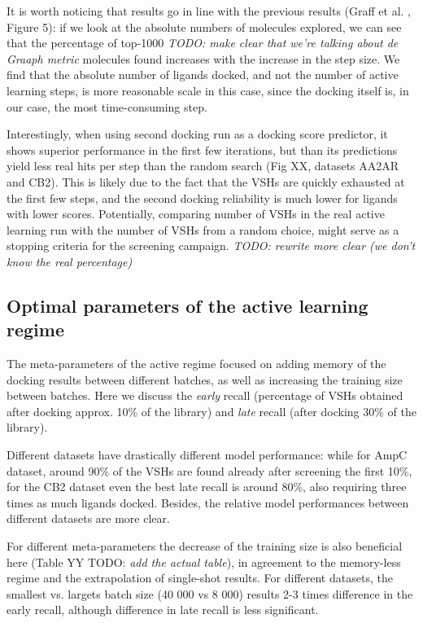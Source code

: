 It is worth noticing that results go in line with the previous results (Graff et al. \cite{Graff2021AcceleratingLearning}, Figure 5): if we look at the absolute numbers of molecules explored, we can see that the percentage of top-1000 \textit{TODO: make clear that we're talking about de Graaph metric} molecules found increases with the increase in the step size. We find that the absolute number of ligands docked, and not the number of active learning steps, is more reasonable scale in this case, since the docking itself is, in our case, the most time-consuming step.

Interestingly, when using second docking run as a docking score predictor, it shows superior performance in the first few iterations, but than its predictions yield less real hits per step than the random search (Fig XX, datasets AA2AR and CB2). This is likely due to the fact that the VSHs are quickly exhausted at the first few steps, and the second docking reliability is much lower for ligands with lower scores. Potentially, comparing number of VSHs in the real active learning run with the number of VSHs from a random choice, might serve as a stopping criteria for the screening campaign. \textit{TODO: rewrite more clear (we don't know the real percentage)}

\subsection{Optimal parameters of the active learning regime}
The meta-parameters of the active regime focused on adding memory of the docking results between different batches, as well as increasing the training size between batches. Here we discuss the \textit{early} recall (percentage of VSHs obtained after docking approx. 10\% of the library) and \textit{late} recall (after docking 30\% of the library).

Different datasets have drastically different model performance: while for AmpC dataset, around 90\% of the VSHs are found already after screening the first 10\%, for the CB2 dataset even the best late recall is around 80\%, also requiring three times as much ligands docked. Besides, the relative model performances between different datasets are more clear.

For different meta-parameters the decrease of the training size is also beneficial here (Table YY TODO: \textit{add the actual table}), in agreement to the memory-less regime and the extrapolation of single-shot results. For different datasets, the smallest vs. largets batch size (40 000 vs 8 000) results 2-3 times difference in the early recall, although difference in late recall is less significant.


